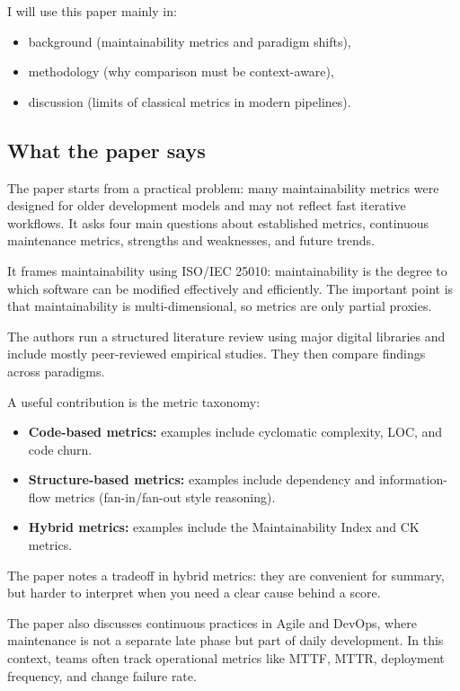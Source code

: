 \documentclass[11pt,a4paper]{article}
\begin{document}
I will use this paper mainly in:
\begin{itemize}[leftmargin=*]
  \item background (maintainability metrics and paradigm shifts),
  \item methodology (why comparison must be context-aware),
  \item discussion (limits of classical metrics in modern pipelines).
\end{itemize}

\subsection{What the paper says}
The paper starts from a practical problem: many maintainability metrics were designed for older development models and may not reflect fast iterative workflows. It asks four main questions about established metrics, continuous maintenance metrics, strengths and weaknesses, and future trends.

It frames maintainability using ISO/IEC 25010: maintainability is the degree to which software can be modified effectively and efficiently. The important point is that maintainability is multi-dimensional, so metrics are only partial proxies.

The authors run a structured literature review using major digital libraries and include mostly peer-reviewed empirical studies. They then compare findings across paradigms.

A useful contribution is the metric taxonomy:
\begin{itemize}[leftmargin=*]
  \item \textbf{Code-based metrics:} examples include cyclomatic complexity, LOC, and code churn.
  \item \textbf{Structure-based metrics:} examples include dependency and information-flow metrics (fan-in/fan-out style reasoning).
  \item \textbf{Hybrid metrics:} examples include the Maintainability Index and CK metrics.
\end{itemize}
The paper notes a tradeoff in hybrid metrics: they are convenient for summary, but harder to interpret when you need a clear cause behind a score.

The paper also discusses continuous practices in Agile and DevOps, where maintenance is not a separate late phase but part of daily development. In this context, teams often track operational metrics like MTTF, MTTR, deployment frequency, and change failure rate.
\end{document}
